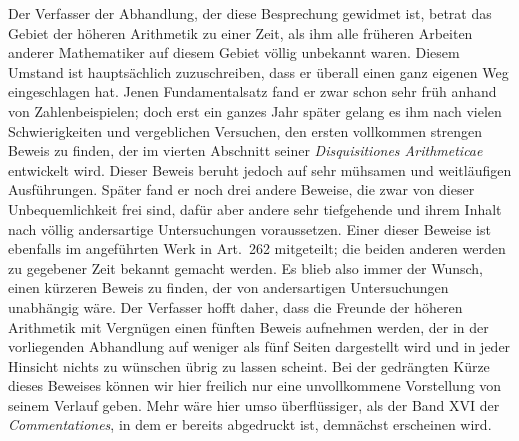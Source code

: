 Der Verfasser der Abhandlung, der diese Besprechung gewidmet ist, betrat das Gebiet der höheren Arithmetik zu einer Zeit, als ihm alle früheren Arbeiten anderer Mathematiker auf diesem Gebiet völlig unbekannt waren. Diesem Umstand ist hauptsächlich zuzuschreiben, dass er überall einen ganz eigenen Weg eingeschlagen hat. Jenen Fundamentalsatz fand er zwar schon sehr früh anhand von Zahlenbeispielen; doch erst ein ganzes Jahr später gelang es ihm nach vielen Schwierigkeiten und vergeblichen Versuchen, den ersten vollkommen strengen Beweis zu finden, der im vierten Abschnitt seiner \emph{Disquisitiones Arithmeticae} entwickelt wird. Dieser Beweis beruht jedoch auf sehr mühsamen und weitläufigen Ausführungen. Später fand er noch drei andere Beweise, die zwar von dieser Unbequemlichkeit frei sind, dafür aber andere sehr tiefgehende und ihrem Inhalt nach völlig andersartige Untersuchungen voraussetzen. Einer dieser Beweise ist ebenfalls im angeführten Werk in Art.~262 mitgeteilt; die beiden anderen werden zu gegebener Zeit bekannt gemacht werden. Es blieb also immer der Wunsch, einen kürzeren Beweis zu finden, der von andersartigen Untersuchungen unabhängig wäre. Der Verfasser hofft daher, dass die Freunde der höheren Arithmetik mit Vergnügen einen fünften Beweis aufnehmen werden, der in der vorliegenden Abhandlung auf weniger als fünf Seiten dargestellt wird und in jeder Hinsicht nichts zu wünschen übrig zu lassen scheint. Bei der gedrängten Kürze dieses Beweises können wir hier freilich nur eine unvollkommene Vorstellung von seinem Verlauf geben. Mehr wäre hier umso überflüssiger, als der Band XVI der \emph{Commentationes}, in dem er bereits abgedruckt ist, demnächst erscheinen wird.

